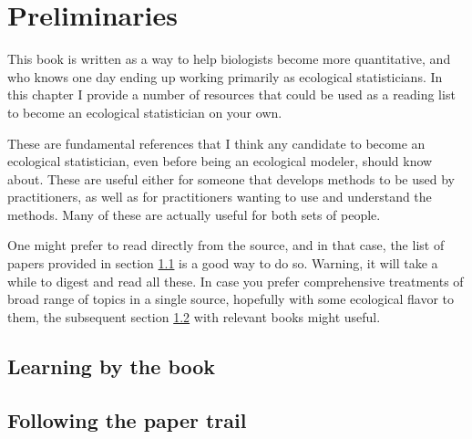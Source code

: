 \documentclass[
]{book}
\begin{document}
\hypertarget{prelim}{%
\chapter{Preliminaries}\label{prelim}}

This book is written as a way to help biologists become more quantitative, and who knows one day ending up working primarily as ecological statisticians. In this chapter I provide a number of resources that could be used as a reading list to become an ecological statistician on your own.

These are fundamental references that I think any candidate to become an ecological statistician, even before being an ecological modeler, should know about. These are useful either for someone that develops methods to be used by practitioners, as well as for practitioners wanting to use and understand the methods. Many of these are actually useful for both sets of people.

One might prefer to read directly from the source, and in that case, the list of papers provided in section \ref{lbtb} is a good way to do so. Warning, it will take a while to digest and read all these. In case you prefer comprehensive treatments of broad range of topics in a single source, hopefully with some ecological flavor to them, the subsequent section \ref{ftpt} with relevant books might useful.

\hypertarget{lbtb}{%
\section{Learning by the book}\label{lbtb}}

\citet{Zuur2009a}

\citet{Zuur2007}

\citet{Zuur2009b}

\citet{Faraway2006}

\hypertarget{ftpt}{%
\section{Following the paper trail}\label{ftpt}}
\end{document}
